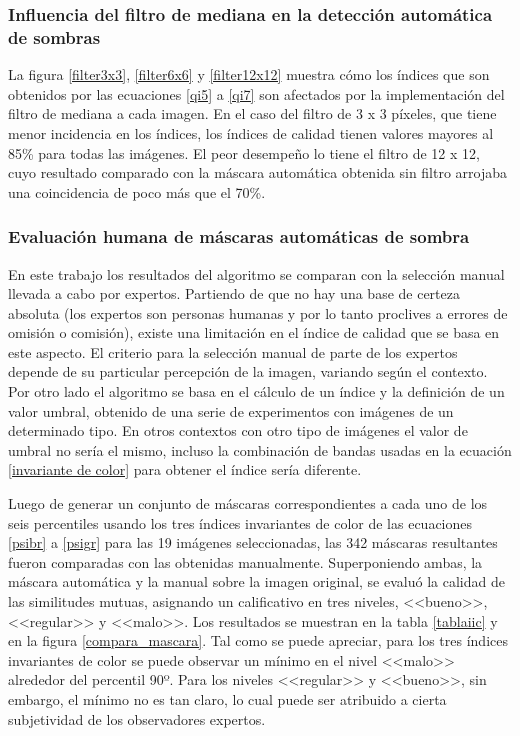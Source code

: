 \subsubsection{Influencia del filtro de mediana en la detección automática de sombras}

La figura \ref{filter3x3}, \ref{filter6x6} y \ref{filter12x12} muestra cómo los índices que son obtenidos por las ecuaciones \ref{qi5} a \ref{qi7} son afectados por la implementación del filtro de mediana a cada imagen. En el caso del filtro de 3 x 3 píxeles, que tiene menor incidencia en los índices, los índices de calidad tienen valores mayores al 85\% para todas las imágenes. El peor desempeño lo tiene el filtro de 12 x 12, cuyo resultado comparado con la máscara automática obtenida sin filtro arrojaba una coincidencia de poco más que el 70\%.

\subsubsection{Evaluación humana de máscaras automáticas de sombra}

En este trabajo los resultados del algoritmo se comparan con la selección manual llevada a cabo por expertos. Partiendo de que no hay una base de certeza absoluta (los expertos son personas humanas y por lo tanto proclives a errores de omisión o comisión), existe una limitación en el índice de calidad que se basa en este aspecto. El criterio para la selección manual de parte de los expertos depende de su particular percepción de la imagen, variando según el contexto. Por otro lado el algoritmo se basa en el cálculo de un índice y la definición de un valor umbral, obtenido de una serie de experimentos con imágenes de un determinado tipo. En otros contextos con otro tipo de imágenes el valor de umbral no sería el mismo, incluso la combinación de bandas usadas en la ecuación \ref{invariante de color} para obtener el índice sería diferente.

Luego de generar un conjunto de máscaras correspondientes a cada uno de los seis percentiles usando los tres índices invariantes de color de las ecuaciones \ref{psibr} a \ref{psigr} para las 19 imágenes seleccionadas, las 342 máscaras resultantes fueron comparadas con las obtenidas manualmente. Superponiendo ambas, la máscara automática y la manual sobre la imagen original, se evaluó la calidad de las similitudes mutuas, asignando un calificativo en tres niveles, <<bueno>>, <<regular>> y <<malo>>. Los resultados se muestran en la tabla \ref{tablaiic} y en la figura \ref{compara_mascara}. Tal como se puede apreciar, para los tres índices invariantes de color se puede observar un mínimo en el nivel <<malo>> alrededor del percentil 90º. Para los niveles <<regular>> y <<bueno>>, sin embargo, el mínimo no es tan claro, lo cual puede ser atribuido a cierta subjetividad de los observadores expertos.

